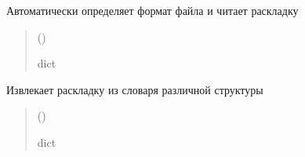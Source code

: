 \documentclass[a4paper,11pt,russian,openany,oneside]{sphinxmanual}
\begin{document}

\begin{savenotes}\begin{fulllineitems}
\label{\detokenize{scan_module:scan_module.read_layout._auto_detect_and_read}}
\pysigstartsignatures
\pysiglinewithargsret
{}
{}
{}
\pysigstopsignatures
\sphinxAtStartPar
Автоматически определяет формат файла и читает раскладку
\begin{quote}\begin{description}
\sphinxAtStartPar
{} ()

\sphinxAtStartPar
dict

\end{description}\end{quote}

\end{fulllineitems}\end{savenotes}


\begin{savenotes}\begin{fulllineitems}
\label{\detokenize{scan_module:scan_module.read_layout._extract_layout_from_dict}}
\pysigstartsignatures
\pysiglinewithargsret
{}
{}
{}
\pysigstopsignatures
\sphinxAtStartPar
Извлекает раскладку из словаря различной структуры
\begin{quote}\begin{description}
\sphinxAtStartPar
{} ()

\sphinxAtStartPar
dict

\end{description}\end{quote}

\end{fulllineitems}\end{savenotes}
\end{document}
